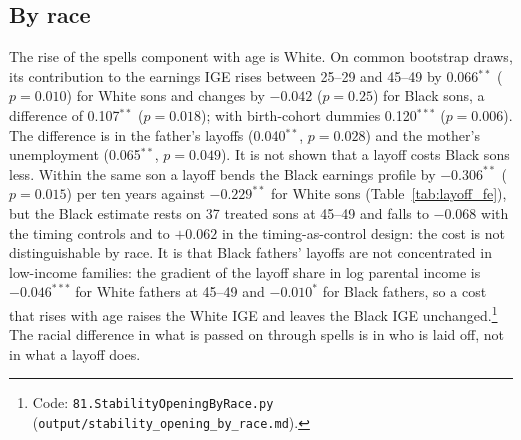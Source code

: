 \subsection{By race}

The rise of the spells component with age is White. On common bootstrap draws, its contribution to the earnings IGE
rises between 25--29 and 45--49 by 0.066$^{**}$ ($p = 0.010$) for White sons and changes by $-0.042$ ($p = 0.25$) for
Black sons, a difference of 0.107$^{**}$ ($p = 0.018$); with birth-cohort dummies 0.120$^{***}$ ($p = 0.006$). The
difference is in the father's layoffs (0.040$^{**}$, $p = 0.028$) and the mother's unemployment (0.065$^{**}$,
$p = 0.049$). It is not shown that a layoff costs Black sons less. Within the same son a layoff bends the Black
earnings profile by $-0.306^{**}$ ($p = 0.015$) per ten years against $-0.229^{**}$ for White sons
(Table~\ref{tab:layoff_fe}), but the Black estimate rests on 37 treated sons at 45--49 and falls to $-0.068$ with the
timing controls and to $+0.062$ in the timing-as-control design: the cost is not distinguishable by race.
It is that Black fathers' layoffs are not concentrated in low-income families: the gradient of the layoff share in log
parental income is $-0.046^{***}$ for White fathers at 45--49 and $-0.010^{*}$ for Black fathers, so a cost that rises
with age raises the White IGE and leaves the Black IGE unchanged.\footnote{Code: \texttt{81.StabilityOpeningByRace.py}
(\texttt{output/stability\_opening\_by\_race.md}).} The racial difference in what is passed on through spells is in who
is laid off, not in what a layoff does.
